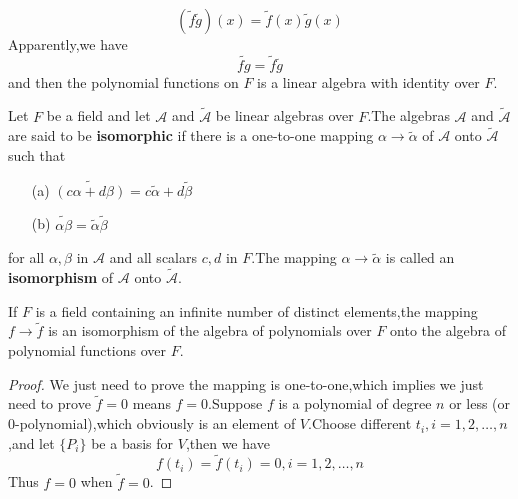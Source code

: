 \documentclass{article}
\begin{document}
\[(\tilde{f}\tilde{g})(x)=\tilde{f}(x)\tilde{g}(x)\]
Apparently,we have
\[\widetilde{fg}=\tilde{f}\tilde{g}\]
and then the polynomial functions on $F$ is a linear algebra with identity over $F$.
\begin{dde}
	Let $F$ be a field and let $\mathcal{A}$ and $\tilde{\mathcal{A}}$ be linear algebras over $F$.The algebras $\mathcal{A}$ and $\tilde{\mathcal{A}}$ are said to be \textbf{isomorphic} if there is a one-to-one mapping $\alpha\rightarrow\tilde{\alpha}$ of $\mathcal{A}$ onto $\tilde{\mathcal{A}}$ such that
	\begin{enumerate}
		\item [(a)]$\widetilde{(c\alpha+d\beta)}=c\tilde{\alpha}+d\tilde{\beta}$
		\item [(b)]$\widetilde{\alpha\beta}=\tilde{\alpha}\tilde{\beta}$
	\end{enumerate}
	for all $\alpha,\beta$ in $\mathcal{A}$ and all scalars $c,d$ in $F$.The mapping $\alpha\rightarrow\tilde{\alpha}$ is called an \textbf{isomorphism} of $\mathcal{A}$ onto $\tilde{\mathcal{A}}$.
\end{dde}
\begin{thm}
	If $F$ is a field containing an infinite number of distinct elements,the mapping $f\rightarrow\tilde{f}$ is an isomorphism of the algebra of polynomials over $F$ onto the algebra of polynomial functions over $F$. 
\end{thm}
\begin{proof}
	We just need to prove the mapping is one-to-one,which implies we just need to prove $\tilde{f}=0$ means $f=0$.Suppose $f$ is a polynomial of degree $n$ or less (or $0$-polynomial),which obviously is an element of $V$.Choose different $t_i,i=1,2,\dots,n$,and let $\{P_i\}$ be a basis for $V$,then we have
	\[f(t_i)=\tilde{f}(t_i)=0,i=1,2,\dots,n\]
	Thus $f=0$ when $\tilde{f}=0$.
\end{proof}
\end{document}
